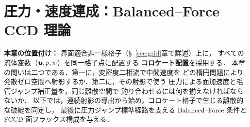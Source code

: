 \section{圧力・速度連成：Balanced--Force CCD 理論}
\label{sec:collocate}%
\label{sec:pressure}%

\noindent\textbf{本章の位置付け：}
界面適合非一様格子（§~\ref{sec:grid}章で詳述）上に，
すべての流体変数（$\bm{u}, p, \psi$）を同一格子点に配置する
\textbf{コロケート配置}を採用する．
本章の問いは二つである．第一に，変密度二相流で中間速度を
どの楕円問題により発散ゼロ空間へ射影するか．第二に，その射影で使う
圧力による面加速度と毛管ジャンプ補正量を，同じ離散空間で
釣り合わせるには何を揃えなければならないか．
以下では，連続射影の導出から始め，コロケート格子で生じる離散的な破綻を同定し，
最後に圧力ジャンプ標準経路を支える Balanced--Force 条件と
FCCD 面フラックス構成を与える．

